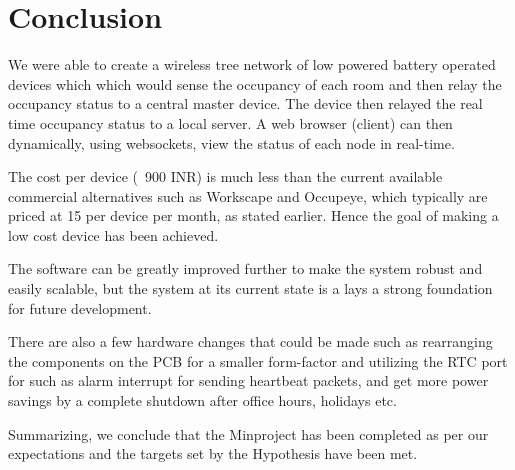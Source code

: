 \chapter{Conclusion}
We were able to create a wireless tree network of low powered battery operated devices which which would sense the occupancy of each room and then relay the occupancy status to a central master device. The device then relayed the real time occupancy status to a local server. A web browser (client) can then dynamically, using websockets, view the status of each node in real-time.

The cost per device (~900 INR) is much less than the current available commercial alternatives such as Workscape\cite{workscape} and Occupeye\cite{occupeye}, which typically are priced at 15\textdollar \hspace{1pt} per device per month, as stated earlier. Hence the goal of making a low cost device has been achieved.

The software can be greatly improved further to make the system robust and easily scalable, but the system at its current state is a lays a strong foundation for future development.

There are also a few hardware changes that could be made such as rearranging the components on the PCB for a smaller form-factor and utilizing the RTC port for such as alarm interrupt for sending heartbeat packets, and get more power savings by a complete shutdown after office hours, holidays etc.

Summarizing, we conclude that the Minproject has been completed as per our expectations and the targets set by the Hypothesis have been met. 
